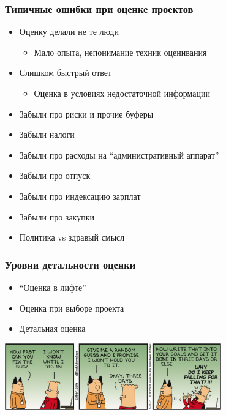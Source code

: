 \documentclass{../../slides-style}
\begin{document}
    \begin{frame}
        \frametitle{Типичные ошибки при оценке проектов}
        \begin{itemize}
            \item Оценку делали не те люди
            \begin{itemize}
                \item Мало опыта, непонимание техник оценивания
            \end{itemize}
            \item Слишком быстрый ответ
            \begin{itemize}
                \item Оценка в условиях недостаточной информации
            \end{itemize}
            \item Забыли про риски и прочие буферы
            \item Забыли налоги
            \item Забыли про расходы на \enquote{административный аппарат}
            \item Забыли про отпуск
            \item Забыли про индексацию зарплат
            \item Забыли про закупки
            \item Политика vs здравый смысл
        \end{itemize}
    \end{frame}

    \begin{frame}
        \frametitle{Уровни детальности оценки}
        \begin{itemize}
            \item \enquote{Оценка в лифте}
            \item Оценка при выборе проекта
            \item Детальная оценка
        \end{itemize}
        \begin{center}
            \includegraphics[width=0.7\textwidth]{dilbertEstimation.png}
        \end{center}
    \end{frame}
\end{document}
